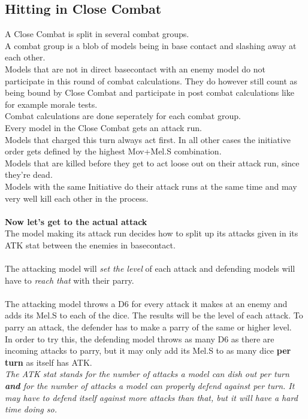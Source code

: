 \documentclass[
	11pt,
	toc=bibliography
	]{article}
\begin{document}
\subsection{Hitting in Close Combat}\label{hittingMelee}
A Close Combat is split in several combat groups.\\
A combat group is a blob of models being in base contact and slashing away at each other.\\
Models that are not in direct basecontact with an enemy model do not participate in this round of combat calculations. They do however still count as being bound by Close Combat and participate in post combat calculations like for example morale tests.\\
Combat calculations are done seperately for each combat group.\\
Every model in the Close Combat gets an attack run.\\
Models that charged this turn always act first. In all other cases the initiative order gets defined by the highest Mov+Mel.S combination.\\
Models that are killed before they get to act loose out on their attack run, since they're dead.\\
Models with the same Initiative do their attack runs at the same time and may very well kill each other in the process.\\\\
\textbf{Now let's get to the actual attack}\\
The model making its attack run decides how to split up its attacks given in its ATK stat between the enemies in basecontact.\\\\
The attacking model will \textit{set the level} of each attack and defending models will have to \textit{reach that} with their parry.\\\\
The attacking model throws a D6 for every attack it makes at an enemy and adds its Mel.S to each of the dice. The results will be the level of each attack. To parry an attack, the defender has to make a parry of the same or higher level.\\
In order to try this, the defending model throws as many D6 as there are incoming attacks to parry, but it may only add its Mel.S to as many dice \textbf{per turn} as itself has ATK.\\ \textit{The ATK stat stands for the number of attacks a model can dish out per turn \textbf{and} for the number of attacks a model can properly defend against per turn. It may have to defend itself against more attacks than that, but it will have a hard time doing so.}\\\\
\end{document}
